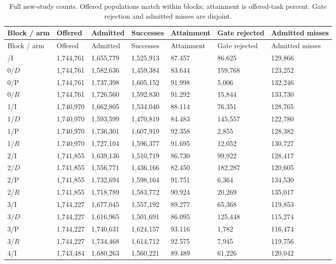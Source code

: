 \documentclass[11pt,a4paper]{article}
\begin{document}
\begingroup
\small
\begin{xltabular}{\textwidth}{@{}YYYYYYY@{}}
\caption{Full new-study counts. Offered populations match within blocks; attainment is offered-task percent. Gate rejection and admitted misses are disjoint.}\label{tab:E1} \\
\toprule
Block / arm & Offered & Admitted & Successes & Attainment & Gate rejected & Admitted misses \\
\midrule\endfirsthead
\toprule
Block / arm & Offered & Admitted & Successes & Attainment & Gate rejected & Admitted misses \\
\midrule\endhead
\bottomrule{}/I & 1,744,761 & 1,655,779 & 1,525,913 & 87.457 & 86,625 & 129,866 \\
0/$D$ & 1,744,761 & 1,582,636 & 1,459,384 & 83.644 & 159,768 & 123,252 \\
0/P & 1,744,761 & 1,737,398 & 1,605,152 & 91.998 & 5,006 & 132,246 \\
0/$R$ & 1,744,761 & 1,726,560 & 1,592,830 & 91.292 & 15,844 & 133,730 \\
1/I & 1,740,970 & 1,662,805 & 1,534,040 & 88.114 & 76,351 & 128,765 \\
1/$D$ & 1,740,970 & 1,593,599 & 1,470,819 & 84.483 & 145,557 & 122,780 \\
1/P & 1,740,970 & 1,736,301 & 1,607,919 & 92.358 & 2,855 & 128,382 \\
1/$R$ & 1,740,970 & 1,727,104 & 1,596,377 & 91.695 & 12,052 & 130,727 \\
2/I & 1,741,855 & 1,639,136 & 1,510,719 & 86.730 & 99,922 & 128,417 \\
2/$D$ & 1,741,855 & 1,556,771 & 1,436,166 & 82.450 & 182,287 & 120,605 \\
2/P & 1,741,855 & 1,732,694 & 1,598,164 & 91.751 & 6,364 & 134,530 \\
2/$R$ & 1,741,855 & 1,718,789 & 1,583,772 & 90.924 & 20,269 & 135,017 \\
3/I & 1,744,227 & 1,677,045 & 1,557,192 & 89.277 & 65,368 & 119,853 \\
3/$D$ & 1,744,227 & 1,616,965 & 1,501,691 & 86.095 & 125,448 & 115,274 \\
3/P & 1,744,227 & 1,740,631 & 1,624,157 & 93.116 & 1,782 & 116,474 \\
3/$R$ & 1,744,227 & 1,734,468 & 1,614,712 & 92.575 & 7,945 & 119,756 \\
4/I & 1,743,484 & 1,680,263 & 1,560,221 & 89.489 & 61,226 & 120,042 \\

\end{xltabular}
\end{document}
